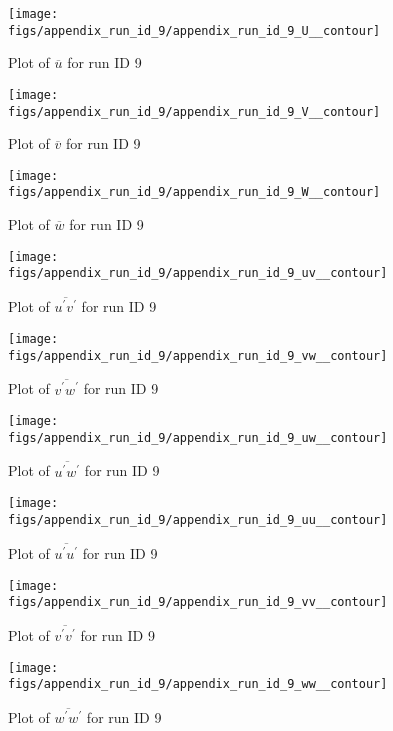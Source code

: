 \begin{figure}[H]
\centering
\texttt{[image: figs/appendix\_run\_id\_9/appendix\_run\_id\_9\_U\_\_contour]}
\caption{Plot of $\overline{u}$ for run ID 9}
\label{fig:appendix_run_id_9_U__contour}
\end{figure}


\begin{figure}[H]
\centering
\texttt{[image: figs/appendix\_run\_id\_9/appendix\_run\_id\_9\_V\_\_contour]}
\caption{Plot of $\overline{v}$ for run ID 9}
\label{fig:appendix_run_id_9_V__contour}
\end{figure}


\begin{figure}[H]
\centering
\texttt{[image: figs/appendix\_run\_id\_9/appendix\_run\_id\_9\_W\_\_contour]}
\caption{Plot of $\overline{w}$ for run ID 9}
\label{fig:appendix_run_id_9_W__contour}
\end{figure}


\begin{figure}[H]
\centering
\texttt{[image: figs/appendix\_run\_id\_9/appendix\_run\_id\_9\_uv\_\_contour]}
\caption{Plot of $\overline{u^\prime v^\prime}$ for run ID 9}
\label{fig:appendix_run_id_9_uv__contour}
\end{figure}


\begin{figure}[H]
\centering
\texttt{[image: figs/appendix\_run\_id\_9/appendix\_run\_id\_9\_vw\_\_contour]}
\caption{Plot of $\overline{v^\prime w^\prime}$ for run ID 9}
\label{fig:appendix_run_id_9_vw__contour}
\end{figure}


\begin{figure}[H]
\centering
\texttt{[image: figs/appendix\_run\_id\_9/appendix\_run\_id\_9\_uw\_\_contour]}
\caption{Plot of $\overline{u^\prime w^\prime}$ for run ID 9}
\label{fig:appendix_run_id_9_uw__contour}
\end{figure}


\begin{figure}[H]
\centering
\texttt{[image: figs/appendix\_run\_id\_9/appendix\_run\_id\_9\_uu\_\_contour]}
\caption{Plot of $\overline{u^\prime u^\prime}$ for run ID 9}
\label{fig:appendix_run_id_9_uu__contour}
\end{figure}


\begin{figure}[H]
\centering
\texttt{[image: figs/appendix\_run\_id\_9/appendix\_run\_id\_9\_vv\_\_contour]}
\caption{Plot of $\overline{v^\prime v^\prime}$ for run ID 9}
\label{fig:appendix_run_id_9_vv__contour}
\end{figure}


\begin{figure}[H]
\centering
\texttt{[image: figs/appendix\_run\_id\_9/appendix\_run\_id\_9\_ww\_\_contour]}
\caption{Plot of $\overline{w^\prime w^\prime}$ for run ID 9}
\label{fig:appendix_run_id_9_ww__contour}
\end{figure}


